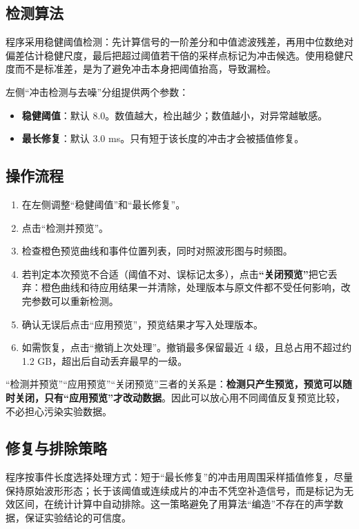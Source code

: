 \documentclass[UTF8,a4paper,12pt,scheme=chinese]{ctexart}
\begin{document}
\subsection{检测算法}

程序采用稳健阈值检测：先计算信号的一阶差分和中值滤波残差，再用中位数绝对偏差估计稳健尺度，最后把超过阈值若干倍的采样点标记为冲击候选。使用稳健尺度而不是标准差，是为了避免冲击本身把阈值抬高，导致漏检。

左侧“冲击检测与去噪”分组提供两个参数：

\begin{itemize}
  \item \textbf{稳健阈值}：默认 8.0。数值越大，检出越少；数值越小，对异常越敏感。
  \item \textbf{最长修复}：默认 3.0 ms。只有短于该长度的冲击才会被插值修复。
\end{itemize}

\subsection{操作流程}

\begin{enumerate}
  \item 在左侧调整“稳健阈值”和“最长修复”。
  \item 点击“检测并预览”。
  \item 检查橙色预览曲线和事件位置列表，同时对照波形图与时频图。
  \item 若判定本次预览不合适（阈值不对、误标记太多），点击\textbf{“关闭预览”}把它丢弃：橙色曲线和待应用结果一并清除，处理版本与原文件都不受任何影响，改完参数可以重新检测。
  \item 确认无误后点击“应用预览”，预览结果才写入处理版本。
  \item 如需恢复，点击“撤销上次处理”。撤销最多保留最近 4 级，且总占用不超过约 1.2 GB，超出后自动丢弃最早的一级。
\end{enumerate}

“检测并预览”“应用预览”“关闭预览”三者的关系是：\textbf{检测只产生预览，预览可以随时关闭，只有“应用预览”才改动数据}。因此可以放心用不同阈值反复预览比较，不必担心污染实验数据。

\subsection{修复与排除策略}

程序按事件长度选择处理方式：短于“最长修复”的冲击用周围采样插值修复，尽量保持原始波形形态；长于该阈值或连续成片的冲击不凭空补造信号，而是标记为无效区间，在统计计算中自动排除。这一策略避免了用算法“编造”不存在的声学数据，保证实验结论的可信度。
\end{document}

